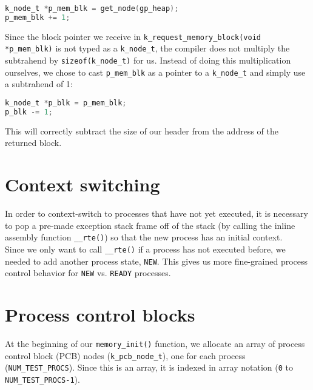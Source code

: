 \documentclass[12pt]{report}
\begin{document}
\begin{minipage}{\textwidth}
\begin{lstlisting}[language=C]
k_node_t *p_mem_blk = get_node(gp_heap);
p_mem_blk += 1;
\end{lstlisting}
\end{minipage}

Since the block pointer we receive in \texttt{k_request_memory_block(void *p_mem_blk)} is not typed as a \texttt{k_node_t}, the compiler does not multiply the subtrahend by \texttt{sizeof(k_node_t)} for us. Instead of doing this multiplication ourselves, we chose to cast \texttt{p_mem_blk} as a pointer to a \texttt{k_node_t} and simply use a subtrahend of 1:

\begin{minipage}{\textwidth}
\begin{lstlisting}[language=C]
k_node_t *p_blk = p_mem_blk;
p_blk -= 1;
\end{lstlisting}
\end{minipage}

This will correctly subtract the size of our header from the address of the returned block.

\section{Context switching}

In order to context-switch to processes that have not yet executed, it is necessary to pop a pre-made exception stack frame off of the stack (by calling the inline assembly function \texttt{__rte()}) so that the new process has an initial context.\\

Since we only want to call \texttt{__rte()} if a process has not executed before, we needed to add another process state, \texttt{NEW}. This gives us more fine-grained process control behavior for \texttt{NEW} vs. \texttt{READY} processes.

\section{Process control blocks}

At the beginning of our \texttt{memory_init()} function, we allocate an array of process control block (PCB) nodes (\texttt{k_pcb_node_t}), one for each process (\texttt{NUM_TEST_PROCS}). Since this is an array, it is indexed in array notation (\texttt{0} to \texttt{NUM_TEST_PROCS-1}).\\
\end{document}
